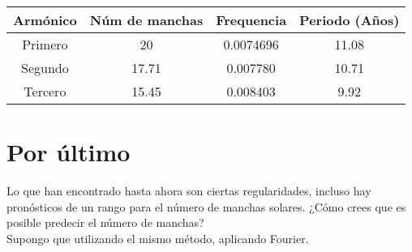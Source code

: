 \documentclass[12pt,a4paper]{article}
\begin{document}
\begin{table}[b!]
\centering
\label{my-label}
\begin{tabular}{|c|c|c|c|}
\hline
Armónico & Núm de manchas & Frequencia & Periodo (Años) \\ \hline
Primero  & 20             & 0.0074696  & 11.08          \\ \hline
Segundo  & 17.71          & 0.007780   & 10.71          \\ \hline
Tercero  & 15.45          & 0.008403   & 9.92           \\ \hline
\end{tabular}
\end{table}


\section{Por último}

Lo que han encontrado hasta ahora son ciertas regularidades, incluso hay pronósticos de un rango para el número de manchas solares. ¿Cómo crees que es posible predecir el número de manchas? \\

Supongo que utilizando el mismo método, aplicando Fourier.
\end{document}

